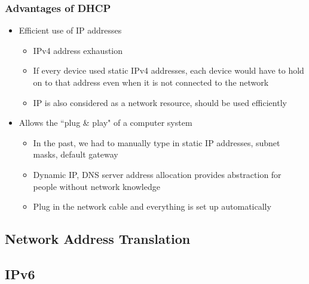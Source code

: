 \subsubsection{Advantages of DHCP}
\begin{itemize}
	\item Efficient use of IP addresses
	\begin{itemize}
		\item IPv4 address exhaustion
		\item If every device used static IPv4 addresses, each device would have to hold on to that address even when it is not connected to the network
		\item IP is also considered as a network resource, should be used efficiently
	\end{itemize}
	\item Allows the ``plug \& play" of a computer system
	\begin{itemize}
		\item In the past, we had to manually type in static IP addresses, subnet masks, default gateway
		\item Dynamic IP, DNS server address allocation provides abstraction for people without network knowledge
		\item Plug in the network cable and everything is set up automatically
	\end{itemize}
\end{itemize}
\newpage

\subsection{Network Address Translation}

\subsection{IPv6}
